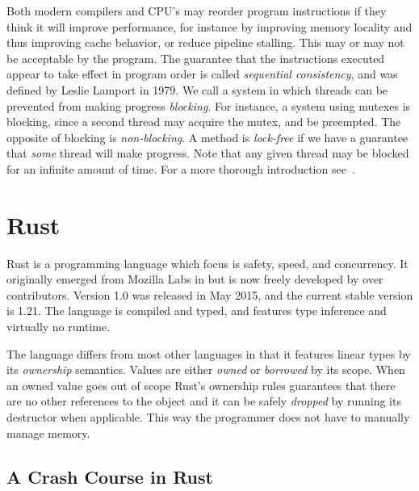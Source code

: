 \documentclass[a4paper,twoside]{report}
\begin{document}
Both modern compilers and CPU's may reorder program instructions if they think
it will improve performance, for instance by improving memory locality and thus
improving cache behavior, or reduce pipeline stalling. This may or may not be
acceptable by the program. The guarantee that the instructions executed appear
to take effect in program order is called \emph{sequential consistency}, and
was defined by Leslie Lamport in 1979.  We call a system in
which threads can be prevented from making progress \emph{blocking}. For
instance, a system using mutexes is blocking, since a second thread may acquire
the mutex, and be preempted. The opposite of blocking is \emph{non-blocking}.  A
method is \emph{lock-free} if we have a guarantee that \emph{some} thread will
make progress.  Note that any given thread may be blocked for an infinite
amount of time.  For a more thorough introduction see~\cite{herlihy2011art}.




\section{Rust}
 Rust is a programming language which focus is safety, speed, and
concurrency.  It originally emerged from Mozilla Labs in  but is now
freely developed by over  contributors.  Version 1.0 was released
in May 2015, and the current stable version is 1.21.  The language is compiled
and typed, and features type inference and virtually no runtime.

The language differs from most other languages in that it features linear types
by its \emph{ownership} semantics.  Values are either \emph{owned} or
\emph{borrowed} by its scope.  When an owned value goes out of scope Rust's
ownership rules guarantees that there are no other references to the object and
it can be safely \emph{dropped} by running its destructor when applicable.
This way the programmer does not have to manually manage memory.

\subsection{A Crash Course in Rust}
\end{document}
